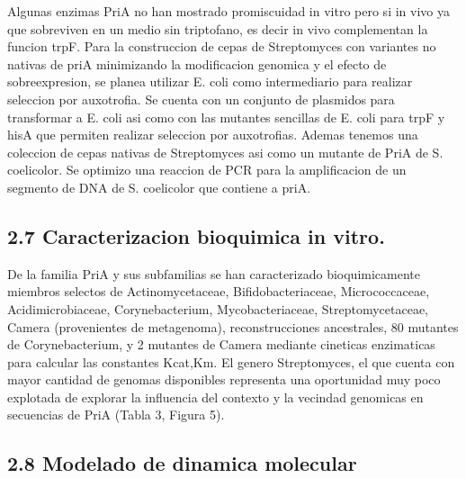 \documentclass[12pt,twoside]{reedthesis}
\begin{document}
  Algunas enzimas PriA no han mostrado promiscuidad in vitro pero si in
  vivo ya que sobreviven en un medio sin triptofano, es decir in vivo
  complementan la funcion trpF. Para la construccion de cepas de
  Streptomyces con variantes no nativas de priA minimizando la
  modificacion genomica y el efecto de sobreexpresion, se planea utilizar
  E. coli como intermediario para realizar seleccion por auxotrofia. Se
  cuenta con un conjunto de plasmidos para transformar a E. coli asi como
  con las mutantes sencillas de E. coli para trpF y hisA que permiten
  realizar seleccion por auxotrofias. Ademas tenemos una coleccion de
  cepas nativas de Streptomyces asi como un mutante de PriA de S.
  coelicolor. Se optimizo una reaccion de PCR para la amplificacion de un
  segmento de DNA de S. coelicolor que contiene a priA.
  
  \subsection{2.7 Caracterizacion bioquimica in
  vitro.}\label{caracterizacion-bioquimica-in-vitro.}
  
  De la familia PriA y sus subfamilias se han caracterizado
  bioquimicamente miembros selectos de Actinomycetaceae,
  Bifidobacteriaceae, Micrococcaceae, Acidimicrobiaceae, Corynebacterium,
  Mycobacteriaceae, Streptomycetaceae, Camera (provenientes de
  metagenoma), reconstrucciones ancestrales, 80 mutantes de
  Corynebacterium, y 2 mutantes de Camera mediante cineticas enzimaticas
  para calcular las constantes Kcat,Km. El genero Streptomyces, el que
  cuenta con mayor cantidad de genomas disponibles representa una
  oportunidad muy poco explotada de explorar la influencia del contexto y
  la vecindad genomicas en secuencias de PriA (Tabla 3, Figura 5).
  
  \subsection{2.8 Modelado de dinamica
  molecular}\label{modelado-de-dinamica-molecular}
  
\end{document}
